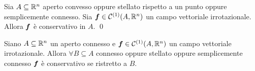 \begin{lemma}
	[di Poincarè]
	Sia $A \subseteq \mathbb{R}^n$ aperto convesso oppure stellato rispetto a un punto oppure semplicemente connesso. Sia $\bm f\in \mathcal{C}^{(1)}(A,\mathbb{R}^n)$ un campo vettoriale irrotazionale. Allora $\bm f$ è conservativo in $A$.
	\qed
\end{lemma}

\begin{corollary}
	Siano $A \subseteq \mathbb{R}^n$ un aperto connesso e $\bm f \in \mathcal{C}^{(1)}(A,\mathbb{R}^n)$ un campo vettoriale irrotazionale. Allora $\forall B\subseteq A$ connesso oppure stellato oppure semplicemente connesso $\bm f$ è conservativo se ristretto a $B$.
\end{corollary}